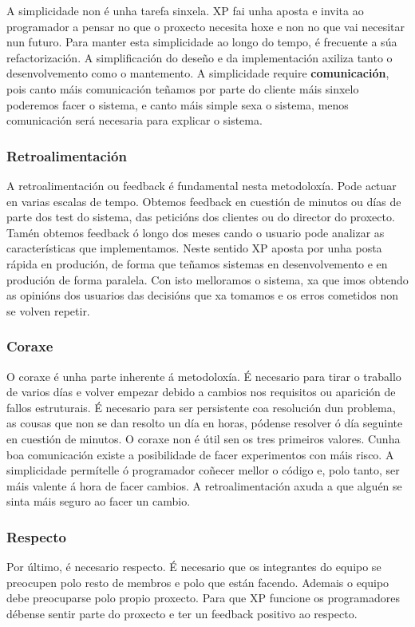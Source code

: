 A simplicidade non é unha tarefa sinxela. XP fai unha aposta e invita ao programador a pensar no que o proxecto necesita hoxe e non no que vai necesitar nun futuro. Para manter esta simplicidade ao longo do tempo, é frecuente a súa refactorización. A simplificación do deseño e da implementación axiliza tanto o desenvolvemento como o mantemento. A simplicidade require \textbf{comunicación}, pois canto máis comunicación teñamos por parte do cliente máis sinxelo poderemos facer o sistema, e canto máis simple sexa o sistema, menos comunicación será necesaria para explicar o sistema.

\subsubsection{Retroalimentación}
A retroalimentación ou feedback é fundamental nesta metodoloxía. Pode actuar en varias escalas de tempo. Obtemos feedback en cuestión de minutos ou días de parte dos test do sistema, das peticións dos clientes ou do director do proxecto. Tamén obtemos feedback ó longo dos meses cando o usuario pode analizar as características que implementamos. Neste sentido XP aposta por unha posta rápida en produción, de forma que teñamos sistemas en desenvolvemento e en produción de forma paralela. Con isto melloramos o sistema, xa que imos obtendo as opinións dos usuarios das decisións que xa tomamos e os erros cometidos non se volven repetir.

\subsubsection{Coraxe}
O coraxe é unha parte inherente á metodoloxía. É necesario para tirar o traballo de varios días e volver empezar debido a cambios nos requisitos ou aparición de fallos estruturais. É necesario para ser persistente coa resolución dun problema, as cousas que non se dan resolto un día en horas, pódense resolver ó día seguinte en cuestión de minutos. O coraxe non é útil sen os tres primeiros valores. Cunha boa comunicación existe a posibilidade de facer experimentos con máis risco. A simplicidade permítelle ó programador coñecer mellor o código e, polo tanto, ser máis valente á hora de facer cambios. A retroalimentación axuda a que alguén se sinta máis seguro ao facer un cambio.

\subsubsection{Respecto}
Por último, é necesario respecto. É necesario que os integrantes do equipo se preocupen polo resto de membros e polo que están facendo. Ademais o equipo debe preocuparse polo propio proxecto. Para que XP funcione os programadores débense sentir parte do proxecto e ter un feedback positivo ao respecto.

